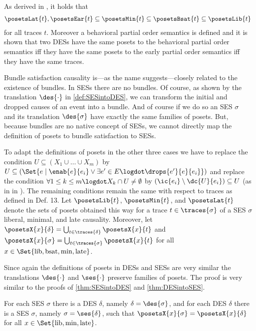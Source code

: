 \documentclass[runningheads,a4paper]{llncs}
\begin{document}
As derived in \cite{Langerak97causalambiguity}, it holds that
\begin{align*}
	\posetsLat{t}, \posetsEar{t} \subseteq \posetsMin{t} \subseteq \posetsBsat{t}
	\subseteq \posetsLib{t}
\end{align*}
for all traces $ t $.
Moreover a behavioral partial order semantics is defined and it is shown that two DESs have the same posets \wrt to the behavioral partial order semantics iff they have the same posets \wrt to the early partial order semantics iff they have the same traces.

Bundle satisfaction causality is---as the name suggests---closely related to the
existence of bundles. In SESs there are no bundles. Of course, as shown by the translation $ \des{\cdot} $ in \ref{def:SESintoDES}, we can transform the initial and dropped causes of an event into a bundle. And of course if we do so an SES $ \sigma $ and its translation $ \des{\sigma} $ have exactly the same families of posets. But, because bundles are no native concept of SESs, we cannot directly map the definition of posets \wrt to bundle satisfaction to SESs.

To adapt the definitions of posets in the other three cases we have to replace
the condition $ U \subseteq \left( X_1 \cup \ldots \cup X_m \right) $ by $ U \subseteq \left( \Set{ e \mid \enab{e}{e_i} \lor \exists e' \in E \logdot \drops{e'}{e}{e_i} } \right) $ and replace the condition $ \forall 1 \leq k \leq m \logdot X_k \cap U \neq \emptyset $ by $ \left( \ic{e_i} \setminus \dc{U}{e_i} \right) \subseteq U $ (as in  in \cite{dynamicCausality15}). The remaining conditions remain the same with respect to traces as defined in Def. 13.
Let $ \posetsLib{t} $, $ \posetsMin{t} $, and $ \posetsLat{t} $ denote the sets of posets obtained this way for a trace $ t \in \traces{\sigma} $ of a SES $ \sigma $ \wrt liberal, minimal, and late causality. Moreover, let $ \posetsX{x}{\delta} = \bigcup_{t \in \traces{\delta}}{\posetsX{x}{t}} $ and $ \posetsX{x}{\sigma} = \bigcup_{t \in \traces{\sigma}}{\posetsX{x}{t}} $ for all $ x \in \Set{ \operatorname{lib}, \operatorname{bsat}, \operatorname{min}, \operatorname{late} } $.

Since again the definitions of posets in DESs and SESs are very similar the translations $ \des{\cdot} $ and $ \ses{\cdot} $ preserve families of posets. The proof is very similar to the proofs of \ths\ref{thm:SESintoDES} and \ref{thm:DESintoSES}.

\begin{theorem}
	For each SES $ \sigma $ there is a DES $ \delta $, namely $ \delta = \des{\sigma} $, and for each DES $ \delta $ there is a SES $ \sigma $, namely $ \sigma = \ses{\delta} $, such that $ \posetsX{x}{\sigma} = \posetsX{x}{\delta} $ for all $ x \in \Set{ \operatorname{lib}, \operatorname{min}, \operatorname{late} } $.
\end{theorem}
\end{document}
